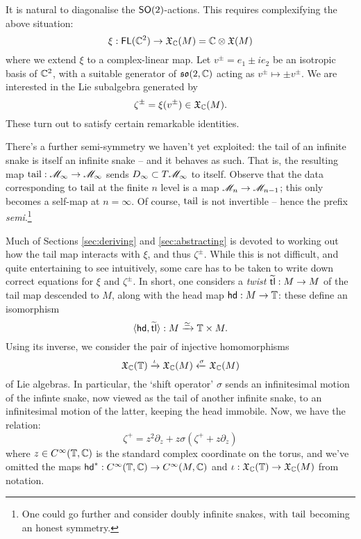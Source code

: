 It is natural to diagonalise the $\mathsf{SO}(2)$-actions. This requires
complexifying the above situation:
\[ \xi : \operatorname{\mathsf{FL}}({\mathbb{C}}^2) \to \mathfrak{X}_{\mathbb{C}}(M) = {\mathbb{C}} \otimes \mathfrak{X}(M)\]
where we extend $\xi$ to a complex-linear map. 
Let $v^\pm = e_1 \pm ie_2$ be an isotropic basis of ${\mathbb{C}}^2$,
with a suitable generator of $\mathfrak{so}(2,{\mathbb{C}})$ acting as $v^\pm\mapsto\pm v^\pm$.
We are interested in the Lie subalgebra 
generated by
\[ \zeta^\pm = \xi(v^\pm) \in \mathfrak{X}_{\mathbb{C}}(M). \]
These turn out to satisfy certain remarkable identities.

There's a further semi-symmetry we haven't yet exploited: the tail of an infinite snake
is itself an infinite snake -- and it behaves as such. That is, the resulting map
$\operatorname{\mathrm{tail}}:\mathscr{M}_\infty \to \mathscr{M}_\infty$ sends $D_\infty \subset T\mathscr{M}_\infty$ to itself.
Observe that the data corresponding to $\operatorname{\mathrm{tail}}$ at the finite $n$ level
is a map $\mathscr{M}_n \to \mathscr{M}_{n-1}$; this only becomes a self-map at $n=\infty$.
Of course, $\operatorname{\mathrm{tail}}$ is not invertible -- hence the prefix \emph{semi}.\footnote{One could
go further and consider doubly infinite snakes, with $\operatorname{\mathrm{tail}}$ becoming an honest symmetry.}

Much of Sections \ref{sec:deriving} and \ref{sec:abstracting} is devoted to 
working out how the tail map interacts with $\xi$, and thus $\zeta^\pm$. While this is
not difficult, and quite entertaining to see intuitively, some care has to be taken to
write down correct equations for $\xi$ and $\zeta^\pm$. 
In short, one considers a \emph{twist} $\operatorname{\widetilde{\operatorname{\mathsf{tl}}}}:M \to M$ of the tail map descended to $M$,
along with the head map $\operatorname{\mathsf{hd}} : M \to {\mathbb{T}}$: these define an isomorphism
\[ \langle \operatorname{\mathsf{hd}},\operatorname{\widetilde{\operatorname{\mathsf{tl}}}}\rangle : M \xrightarrow{\simeq} {\mathbb{T}} \times M. \]
Using its inverse, we consider the pair of injective homomorphisms
\[ \mathfrak{X}_{\mathbb{C}}({\mathbb{T}}) \xrightarrow{\iota} \mathfrak{X}_{\mathbb{C}}(M) \xleftarrow{\sigma} \mathfrak{X}_{\mathbb{C}}(M) \]
of Lie algebras. In particular, the `shift operator'
$\sigma$ sends an infinitesimal motion of the infinte snake,
now viewed as the tail of another infinite snake, to
an infinitesimal motion of the latter, keeping the head immobile. 
Now, we have the relation:
\begin{equation}\label{eq:rec-rel-first}
        \zeta^+ = z^2\partial_z + z\sigma\left(\zeta^+ + z\partial_z \right) 
\end{equation}
where $z \in C^\infty({\mathbb{T}}, {\mathbb{C}})$ is the standard complex coordinate
on the torus, and we've omitted the maps $\operatorname{\mathsf{hd}}^* : C^\infty({\mathbb{T}},{\mathbb{C}}) \to C^\infty(M,{\mathbb{C}})$
and $\iota : \mathfrak{X}_{\mathbb{C}}({\mathbb{T}}) \to \mathfrak{X}_{\mathbb{C}}(M)$ from notation.

